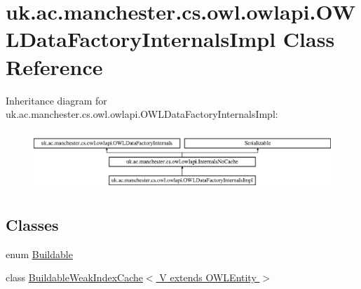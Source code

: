 \hypertarget{classuk_1_1ac_1_1manchester_1_1cs_1_1owl_1_1owlapi_1_1_o_w_l_data_factory_internals_impl}{\section{uk.\-ac.\-manchester.\-cs.\-owl.\-owlapi.\-O\-W\-L\-Data\-Factory\-Internals\-Impl Class Reference}
\label{classuk_1_1ac_1_1manchester_1_1cs_1_1owl_1_1owlapi_1_1_o_w_l_data_factory_internals_impl}
}
Inheritance diagram for uk.\-ac.\-manchester.\-cs.\-owl.\-owlapi.\-O\-W\-L\-Data\-Factory\-Internals\-Impl\-:\begin{figure}[H]
\begin{center}
\leavevmode
\includegraphics[height=2.258065cm]{classuk_1_1ac_1_1manchester_1_1cs_1_1owl_1_1owlapi_1_1_o_w_l_data_factory_internals_impl}
\end{center}
\end{figure}
\subsection*{Classes}
\begin{DoxyCompactItemize}
\item 
enum \hyperlink{enumuk_1_1ac_1_1manchester_1_1cs_1_1owl_1_1owlapi_1_1_o_w_l_data_factory_internals_impl_1_1_buildable}{Buildable}
\item 
class \hyperlink{classuk_1_1ac_1_1manchester_1_1cs_1_1owl_1_1owlapi_1_1_o_w_l_data_factory_internals_impl_1_1_bui2da4e2836e65187c58a7bd99e8ddeb30}{Buildable\-Weak\-Index\-Cache$<$ V extends O\-W\-L\-Entity $>$}
\end{DoxyCompactItemize}
